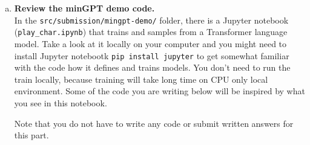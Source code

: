 \begin{enumerate}[(a)]
\item {} \textbf{Review the minGPT demo code.}\\
In  the \texttt{src/submission/mingpt-demo/} folder, there is a Jupyter notebook (\texttt{play\_char.ipynb}) that trains and samples from a Transformer language model.
Take a look at it locally on your computer and you might need to install Jupyter notebootk \texttt{pip install jupyter} to get somewhat familiar with the code how it defines and trains models. You don't need to run the train locally, because training will take long time on CPU only local environment.
Some of the code you are writing below will be inspired by what you see in this notebook.

Note that you do not have to write any code or submit written answers for this part.




\end{enumerate}
